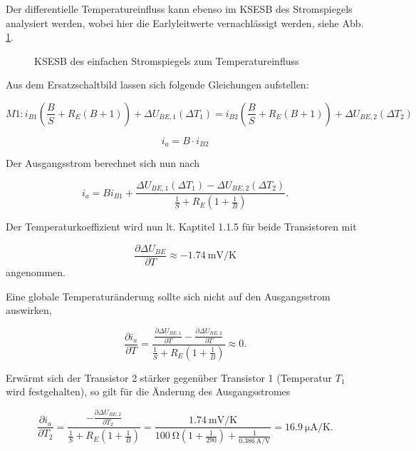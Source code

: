 Der differentielle Temperatureinfluss kann ebenso im KSESB des Stromspiegels analysiert werden, wobei hier die Earlyleitwerte vernachlässigt werden, siehe Abb. \ref{fig_Kap4_11:Temp01}.

\begin{figure}[H]
	\centering
	\def\svgwidth{\textwidth}
	
	\caption{KSESB des einfachen Stromspiegels zum Temperatureinfluss} 
	\label{fig_Kap4_11:Temp01} 
\end{figure}

Aus dem Ersatzschaltbild lassen sich folgende Gleichungen aufstellen:

\begin{equation}
    M1: i_{B1}\left(\frac{B}{S} + R_E (B+1) \right) + \Delta U_{BE,1}(\Delta T_1) = i_{B2}\left(\frac{B}{S} + R_E (B+1) \right) + \Delta U_{BE,2}(\Delta T_2)
\end{equation}

\begin{equation}
    i_a = B \cdot i_{B2}
\end{equation}

Der Ausgangsstrom berechnet sich nun nach

\begin{equation}
    i_a = Bi_{B1} + \frac{\Delta U_{BE,1}(\Delta T_1) - \Delta U_{BE,2}(\Delta T_2)}{\frac{1}{S} + R_E (1+\frac{1}{B})} .
\end{equation}

Der Temperaturkoeffizient wird nun lt. Kaptitel 1.1.5 für beide Transistoren mit

\begin{equation}
    \frac{\partial \Delta U_{BE}}{\partial T} \approx -\SI{1.74}{\milli\volt\per\kelvin}
\end{equation}
angenommen.

Eine globale Temperaturänderung sollte sich nicht auf den Ausgangsstrom auswirken, 

\begin{equation}
    \frac{\partial i_a}{\partial T} = \frac{\frac{\partial \Delta U_{BE,1}}{\partial T} - \frac{\partial \Delta U_{BE,2}}{\partial T}}{\frac{1}{S} + R_E (1+\frac{1}{B})} \approx 0 .
\end{equation}

Erwärmt sich der Transistor 2 stärker gegenüber Transistor 1 (Temperatur $T_1$ wird festgehalten), so gilt für die Änderung des Ausgangsstromes

\begin{equation}
    \frac{\partial i_a}{\partial T_2} = \frac{-\frac{\partial \Delta U_{BE,2}}{\partial T_2}}{\frac{1}{S} + R_E (1+\frac{1}{B})} = \frac{\SI{1.74}{\milli\volt\per\kelvin}}{\SI{100}{\ohm}(1 + \frac{1}{290}) + \frac{1}{\SI{0,386}{\ampere\per\volt}}} = \SI{16,9}{\micro\ampere\per\kelvin} .
\end{equation}

